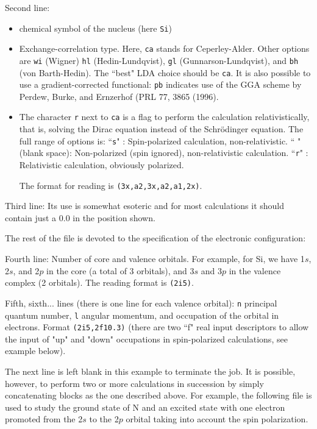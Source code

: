 \documentclass[11pt]{article}
\begin{document}
Second line:
\begin{itemize}
\item
chemical symbol of the nucleus (here {\tt Si})

\item
Exchange-correlation type. Here, {\tt ca} stands for
Ceperley-Alder. Other options are {\tt wi} (Wigner) {\tt hl}
(Hedin-Lundqvist), {\tt gl} (Gunnarson-Lundqvist), and {\tt bh}
(von Barth-Hedin). The ``best" LDA choice should be {\tt ca}.
It is also possible to use a gradient-corrected functional:
{\tt pb} indicates use of the GGA scheme by Perdew, Burke,
and Ernzerhof (PRL 77, 3865 (1996).

\item
The character {\tt r} next to {\tt ca} is a flag to perform the
calculation relativistically, that is, solving the Dirac equation
instead of the Schr\"odinger equation. 
The full range of options is:
``{\tt s}" : Spin-polarized calculation, non-relativistic.
`` " (blank space): Non-polarized (spin ignored), non-relativistic calculation.
``{\tt r}" : Relativistic calculation, obviously polarized.	
	
The format for reading is {\tt (3x,a2,3x,a2,a1,2x)}. 
\end{itemize}

Third line: Its use is somewhat esoteric and for most calculations
it should contain just a 0.0 in the position shown.

The rest of the file is devoted to the specification of the electronic
configuration:

Fourth line: Number of core and valence orbitals. For example, for Si, we
have 1$s$, 2$s$, and 2$p$ in the core (a total of 3 orbitals), and
3$s$ and 3$p$ in the valence complex (2 orbitals). The reading format is
{\tt (2i5)}.

Fifth, sixth... lines (there is one line for each valence orbital):
{\tt n} principal quantum number, {\tt l} angular momentum, and 
occupation of the orbital in electrons. 
Format {\tt (2i5,2f10.3)} (there are two ``f" real input descriptors 
to allow the input of "up" and "down" occupations in spin-polarized 
calculations, see example below).

The next line is left blank in this example to terminate the job. It
is possible, however, to perform two or more calculations in
succession by simply concatenating blocks as the one described above.
For example, the following file is used to study the ground state of N
and an excited state with one electron promoted from the 2$s$ to the 2$p$
orbital taking into account the spin polarization.
\end{document}
